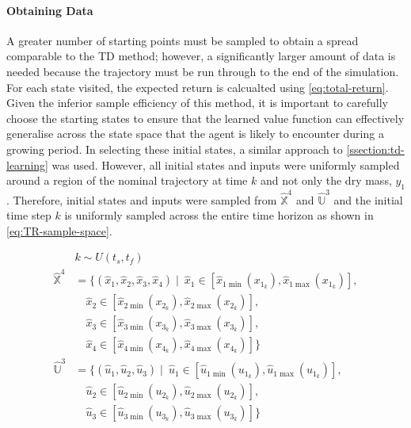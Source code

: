 \paragraph{Obtaining Data}
A greater number of starting points must be sampled to obtain a spread comparable to the TD method; however, a significantly larger amount of data is needed because the trajectory must be run through to the end of the simulation. For each state visited, the expected return is calcualted using \autoref{eq:total-return}. Given the inferior sample efficiency of this method, it is important to carefully choose the starting states to ensure that the learned value function can effectively generalise across the state space that the agent is likely to encounter during a growing period. In selecting these initial states, a similar approach to \autoref{ssection:td-learning} was used. However, all initial states and inputs were uniformly sampled around a region of the nominal trajectory at time $k$ and not only the dry mass, $y_1$. Therefore, initial states and inputs were sampled from $\hat{\mathbb{X}}^4$ and $\hat{\mathbb{U}}^3$ and the initial time step $k$ is uniformly sampled across the entire time horizon as shown in \autoref{eq:TR-sample-space}.

\begin{equation}\label{eq:TR-sample-space}
\begin{split}
	& k \sim U(t_s,t_f)  \\
    \hat{\mathbb{X}}^4 &= \{ (\hat{x}_1, \hat{x}_2, \hat{x}_3, \hat{x}_4) \mid\ \hat{x}_1 \in [\hat{x}_{1\min}(x_{1_k}), \hat{x}_{1\max}(x_{1_k})], \\
    &\quad \hat{x}_2 \in [\hat{x}_{2\min}(x_{2_k}), \hat{x}_{2\max}(x_{2_k})], \\
    &\quad \hat{x}_3 \in [\hat{x}_{3\min}(x_{3_k}), \hat{x}_{3\max}(x_{3_k})], \\
    &\quad \hat{x}_4 \in [\hat{x}_{4\min}(x_{4_k}), \hat{x}_{4\max}(x_{4_k})] \} \\
    \hat{\mathbb{U}}^3 &= \{ (\hat{u}_1, \hat{u}_2, \hat{u}_3) \mid\ \hat{u}_1 \in [\hat{u}_{1\min}(u_{1_k}), \hat{u}_{1\max}(u_{1_k})], \\
    &\quad \hat{u}_2 \in [\hat{u}_{2\min}(u_{2_k}), \hat{u}_{2\max}(u_{2_k})], \\
    &\quad \hat{u}_3 \in [\hat{u}_{3\min}(u_{3_k}), \hat{u}_{3\max}(u_{3_k})] \} \\    
\end{split}
\end{equation}

